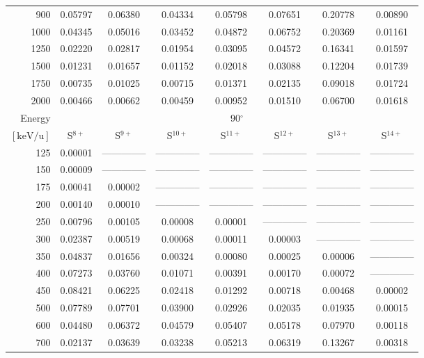 \begin{table}[ht]
\begin{tabular}{r|c|c|c|c|c|c|c}
      900 & 0.05797 & 0.06380 & 0.04334 & 0.05798 & 0.07651 & 0.20778 & 0.00890 \\
     1000 & 0.04345 & 0.05016 & 0.03452 & 0.04872 & 0.06752 & 0.20369 & 0.01161 \\
     1250 & 0.02220 & 0.02817 & 0.01954 & 0.03095 & 0.04572 & 0.16341 & 0.01597 \\
     1500 & 0.01231 & 0.01657 & 0.01152 & 0.02018 & 0.03088 & 0.12204 & 0.01739 \\
     1750 & 0.00735 & 0.01025 & 0.00715 & 0.01371 & 0.02135 & 0.09018 & 0.01724 \\
     2000 & 0.00466 & 0.00662 & 0.00459 & 0.00952 & 0.01510 & 0.06700 & 0.01618 \\ \cline{1-8}
    Energy & \multicolumn{7}{c}{90$^\circ$} \\ \cline{2-8}
    $\mathrm{[keV/u]}$ & S$^{8+}$ & S$^{9+}$ & S$^{10+}$ & S$^{11+}$ & S$^{12+}$ & S$^{13+}$ & S$^{14+}$ \\ \cline{1-8}
      125 & 0.00001 & -------------- & -------------- & -------------- & -------------- & -------------- & -------------- \\
      150 & 0.00009 & -------------- & -------------- & -------------- & -------------- & -------------- & -------------- \\
      175 & 0.00041 & 0.00002 & -------------- & -------------- & -------------- & -------------- & -------------- \\
      200 & 0.00140 & 0.00010 & -------------- & -------------- & -------------- & -------------- & -------------- \\
      250 & 0.00796 & 0.00105 & 0.00008 & 0.00001 & -------------- & -------------- & -------------- \\
      300 & 0.02387 & 0.00519 & 0.00068 & 0.00011 & 0.00003 & -------------- & -------------- \\
      350 & 0.04837 & 0.01656 & 0.00324 & 0.00080 & 0.00025 & 0.00006 & -------------- \\
      400 & 0.07273 & 0.03760 & 0.01071 & 0.00391 & 0.00170 & 0.00072 & -------------- \\
      450 & 0.08421 & 0.06225 & 0.02418 & 0.01292 & 0.00718 & 0.00468 & 0.00002 \\
      500 & 0.07789 & 0.07701 & 0.03900 & 0.02926 & 0.02035 & 0.01935 & 0.00015 \\
      600 & 0.04480 & 0.06372 & 0.04579 & 0.05407 & 0.05178 & 0.07970 & 0.00118 \\
      700 & 0.02137 & 0.03639 & 0.03238 & 0.05213 & 0.06319 & 0.13267 & 0.00318 \\

\end{tabular}
\end{table}
